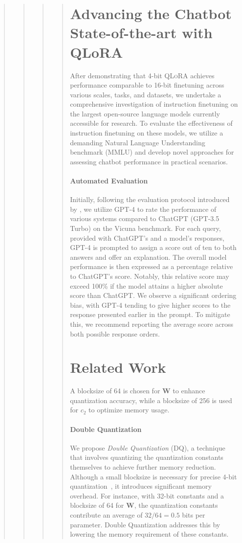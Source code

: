 \begin{quote}
\begin{quote}
\begin{quote}
\begin{quote}
\section{Advancing the Chatbot State-of-the-art with QLoRA}
\label{sec:pushing}
After demonstrating that 4-bit \textsc{QLoRA} achieves performance comparable to 16-bit finetuning across various scales, tasks, and datasets, we undertake a comprehensive investigation of instruction finetuning on the largest open-source language models currently accessible for research. To evaluate the effectiveness of instruction finetuning on these models, we utilize a demanding Natural Language Understanding benchmark (MMLU) and develop novel approaches for assessing chatbot performance in practical scenarios.

\paragraph{Automated Evaluation} Initially, following the evaluation protocol introduced by \citet{vicuna2023}, we utilize GPT-4 to rate the performance of various systems compared to ChatGPT (GPT-3.5 Turbo) on the Vicuna benchmark. For each query, provided with ChatGPT’s and a model’s responses, GPT-4 is prompted to assign a score out of ten to both answers and offer an explanation. The overall model performance is then expressed as a percentage relative to ChatGPT’s score. Notably, this relative score may exceed 100\% if the model attains a higher absolute score than ChatGPT. We observe a significant ordering bias, with GPT-4 tending to give higher scores to the response presented earlier in the prompt. To mitigate this, we recommend reporting the average score across both possible response orders.

\section{Related Work}

A blocksize of 64 is chosen for $\mathbf{W}$ to enhance quantization accuracy, while a blocksize of 256 is used for $c_2$ to optimize memory usage.

\paragraph{Double Quantization{}} 
We propose \emph{Double Quantization} (DQ), a technique that involves quantizing the quantization constants themselves to achieve further memory reduction. Although a small blocksize is necessary for precise 4-bit quantization~\citep{dettmers2022case}, it introduces significant memory overhead. For instance, with 32-bit constants and a blocksize of 64 for $\mathbf{W}$, the quantization constants contribute an average of $32/64 = 0.5$ bits per parameter. Double Quantization addresses this by lowering the memory requirement of these constants.


\end{quote}
\end{quote}
\end{quote}
\end{quote}
